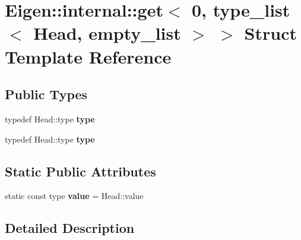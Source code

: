 \hypertarget{struct_eigen_1_1internal_1_1get_3_010_00_01type__list_3_01_head_00_01empty__list_01_4_01_4}{}\section{Eigen\+:\+:internal\+:\+:get$<$ 0, type\+\_\+list$<$ Head, empty\+\_\+list $>$ $>$ Struct Template Reference}
\label{struct_eigen_1_1internal_1_1get_3_010_00_01type__list_3_01_head_00_01empty__list_01_4_01_4}
\subsection*{Public Types}
\begin{DoxyCompactItemize}
\item 
\mbox{\label{struct_eigen_1_1internal_1_1get_3_010_00_01type__list_3_01_head_00_01empty__list_01_4_01_4_a867ab6af5f3ddf9abfade78249100cad}} 
typedef Head\+::type {\bfseries type}
\item 
\mbox{\label{struct_eigen_1_1internal_1_1get_3_010_00_01type__list_3_01_head_00_01empty__list_01_4_01_4_a867ab6af5f3ddf9abfade78249100cad}} 
typedef Head\+::type {\bfseries type}
\end{DoxyCompactItemize}
\subsection*{Static Public Attributes}
\begin{DoxyCompactItemize}
\item 
\mbox{\label{struct_eigen_1_1internal_1_1get_3_010_00_01type__list_3_01_head_00_01empty__list_01_4_01_4_af412a019daa8342d74c008961443a42c}} 
static const type {\bfseries value} = Head\+::value
\end{DoxyCompactItemize}


\subsection{Detailed Description}
